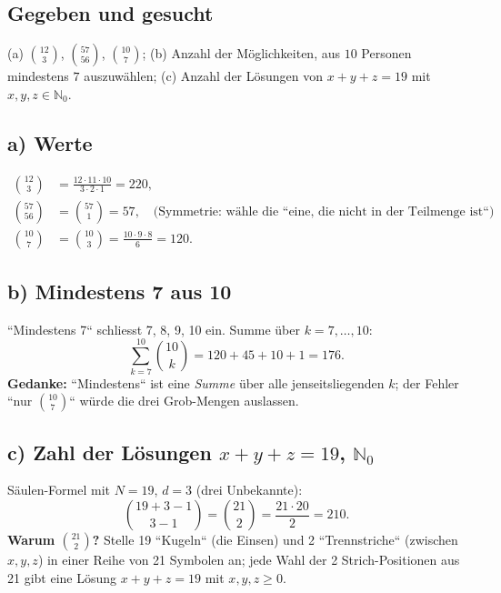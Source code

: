 

\subsection*{Gegeben und gesucht}
(a) $\binom{12}{3}$, $\binom{57}{56}$, $\binom{10}{7}$; (b) Anzahl der
Möglichkeiten, aus $10$ Personen mindestens $7$ auszuwählen; (c) Anzahl der
Lösungen von $x+y+z=19$ mit $x,y,z\in\mathbb N_0$.

\subsection*{a) Werte}
\begin{align}
  \binom{12}{3}&=\frac{12\cdot11\cdot10}{3\cdot2\cdot1}=220,\\
  \binom{57}{56}&=\binom{57}{1}=57, \quad\text{(Symmetrie: wähle die
        ``eine, die nicht in der Teilmenge ist``)}\\
  \binom{10}{7}&=\binom{10}{3}=\frac{10\cdot9\cdot8}{6}=120 .
\end{align}

\subsection*{b) Mindestens 7 aus 10}
``Mindestens 7`` schliesst 7, 8, 9, 10 ein. Summe über $k=7,\dots,10$:
\begin{equation}
  \sum_{k=7}^{10}\binom{10}{k}=120+45+10+1=176 .
\end{equation}
\textbf{Gedanke:} ``Mindestens`` ist eine \emph{Summe} über alle
jenseitsliegenden $k$; der Fehler ``nur $\binom{10}{7}$`` würde die drei
Grob-Mengen auslassen.

\subsection*{c) Zahl der Lösungen $x+y+z=19$, $\mathbb N_0$}
Säulen-Formel mit $N=19$, $d=3$ (drei Unbekannte):
\begin{equation}
  \binom{19+3-1}{3-1}=\binom{21}{2}=\frac{21\cdot20}{2}=210 .
\end{equation}
\textbf{Warum $\binom{21}{2}$?} Stelle 19 ``Kugeln`` (die Einsen) und 2
``Trennstriche`` (zwischen $x,y,z$) in einer Reihe von 21 Symbolen an;
jede Wahl der 2 Strich-Positionen aus 21 gibt eine Lösung
$x+y+z=19$ mit $x,y,z\ge0$.

